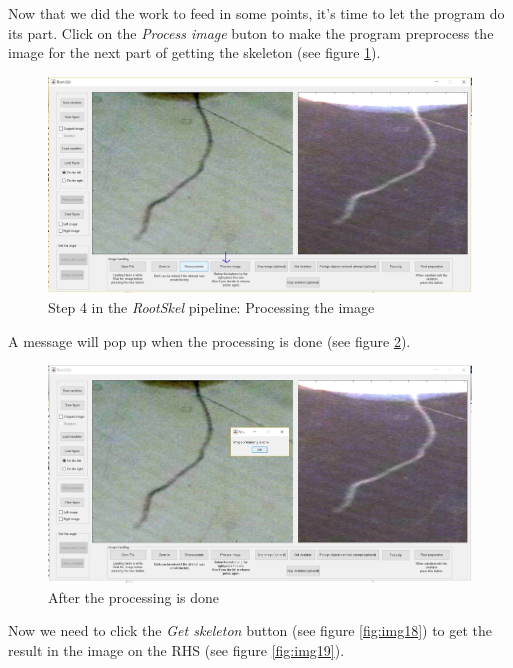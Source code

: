 Now that we did the work to feed in some points, it's time to let the program do its part. Click on the \textit{Process image} buton to make the program preprocess the image for the next part of getting the skeleton (see figure \ref{fig:img16}).

\begin{figure}[H]
	\centering
	\includegraphics[width=\textwidth]{../Figures/manual/step13.jpg}
	\caption{Step 4 in the \textit{RootSkel} pipeline: Processing the image}
	\label{fig:img16}
\end{figure}

A message will pop up when the processing is done (see figure \ref{fig:img17}).
\begin{figure}[H]
	\centering
	\includegraphics[width=\textwidth]{../Figures/manual/step14.jpg}
	\caption{After the processing is done}
	\label{fig:img17}
\end{figure}

Now we need to click the \textit{Get skeleton} button (see figure \ref{fig:img18}) to get the result in the image on the RHS (see figure \ref{fig:img19}).

